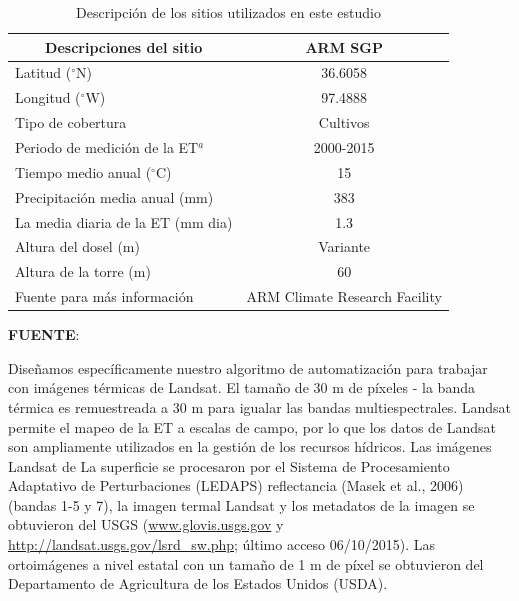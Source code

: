 \begin{table}[H]
\centering
\begin{threeparttable}
\caption{Descripción de los sitios utilizados en este estudio}
\label{tab:2}
\begin{tabular}{@{}lc@{}}
\hline
\multicolumn{1}{c}{Descripciones del sitio} & ARM SGP \\ \hline
Latitud ($^{\circ}$N) & 36.6058 \\
Longitud ($^{\circ}$W) & 97.4888 \\
Tipo de cobertura & Cultivos \\
Periodo de medición de la ET$^{a}$ & 2000-2015 \\
Tiempo medio anual ($^{\circ}$C) & 15 \\
Precipitación media anual (mm) & 383 \\
La media diaria de la ET (mm dia) & 1.3 \\
Altura del dosel (m) & Variante \\
Altura de la torre (m) & 60 \\
Fuente para más información & ARM Climate Research Facility \\ \hline
\end{tabular}
    \begin{tablenotes}
    \vspace{-0.5cm}
      \item {{\fontsize{10pt}{ \baselineskip}\selectfont \textbf{FUENTE}: \parencite{Bhattarai2017}}}
    \end{tablenotes}
\end{threeparttable}
\end{table}
\vspace{-0.6cm}
Diseñamos específicamente nuestro algoritmo de automatización para trabajar con imágenes térmicas de Landsat. El tamaño de 30 m de píxeles - la banda térmica es remuestreada a 30 m para igualar las bandas multiespectrales. Landsat permite el mapeo de la ET a escalas de campo, por lo que los datos de Landsat son ampliamente utilizados en la gestión de los recursos hídricos.  Las imágenes Landsat de La superficie se procesaron por el Sistema de Procesamiento Adaptativo de Perturbaciones (LEDAPS) reflectancia (Masek et al., 2006) (bandas 1-5 y 7), la imagen termal Landsat y los metadatos de la imagen se obtuvieron del USGS (\url{www.glovis.usgs.gov} y \url{http://landsat.usgs.gov/lsrd_sw.php}; último acceso 06/10/2015). Las ortoimágenes a nivel estatal con un tamaño de 1 m de píxel se obtuvieron del Departamento de Agricultura de los Estados Unidos (USDA).

